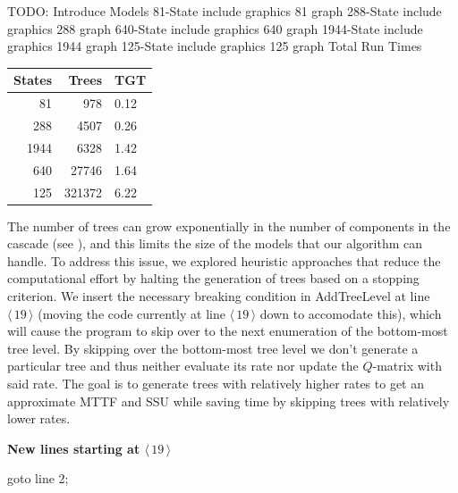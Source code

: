 \documentclass[12pt]{article}
\newcommand{\changed}[1]{#1}
\newcommand{\changed}[1]{\textcolor{red}{#1}}
\newcommand{\citeLine}[1]{$\langle \, #1 \, \rangle$}
\begin{document}
TODO: Introduce Models
81-State
include graphics 81 graph
288-State
include graphics 288 graph
640-State
include graphics 640 graph
1944-State
include graphics 1944 graph
125-State
include graphics 125 graph
\changed{Total Run Times}

\noindent\begin{minipage}[c]{\textwidth}
	\centering
    \begin{tabular}{|r|r|l|}
    \hline
	    States & Trees  & TGT  \\ \hline
	    81    & 978    & 0.12 \\ \hline
	    288   & 4507   & 0.26 \\ \hline
	    1944  & 6328   & 1.42 \\ \hline
	    640   & 27746  & 1.64 \\ \hline
	    125   & 321372 & 6.22 \\ \hline
	\end{tabular}
	\label{fig:table}
\end{minipage}

\vspace{1em}
The number of trees can grow exponentially in the number of components in the
cascade (see \cite{ING:2009}), and this limits the size of the models that our
algorithm can handle.  To address this issue, we explored heuristic approaches
that reduce the computational effort by halting the generation of trees based
on a stopping criterion. We insert the necessary breaking condition in
\mbox{AddTreeLevel} at line \citeLine{19} \changed{(moving the code currently at line \citeLine{19} down to accomodate this)}, which will cause the program to skip over to the next enumeration of the bottom-most tree level. \changed{By skipping over the bottom-most tree level we don't generate a particular tree and thus neither evaluate its rate nor update the $Q$-matrix with said rate. The goal is to generate trees with relatively higher rates to get an approximate MTTF and SSU while saving time by skipping trees with relatively lower rates.}

\vspace{1em}
\noindent\textbf{New lines starting at \citeLine{19}}
\changed{
\begin{algorithmic}[1]
\IF{stopping criterion satisfied}
 	\STATE goto line 2;
\ENDIF
\end{algorithmic}
}
\vspace{1em}
\end{document}
